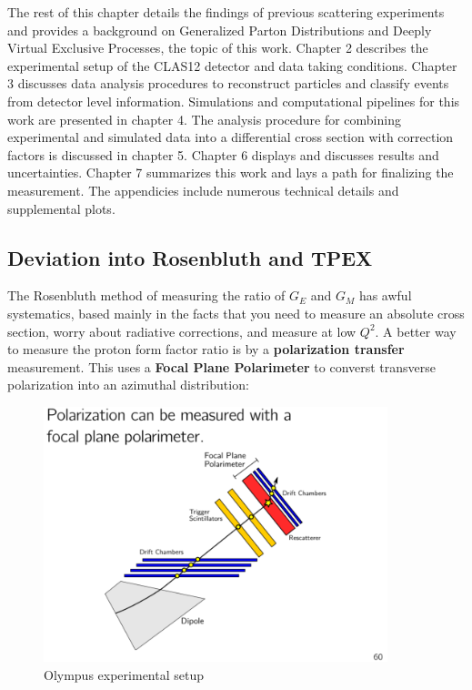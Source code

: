 The rest of this chapter details the findings of previous scattering experiments and provides a background on Generalized Parton Distributions and Deeply Virtual Exclusive Processes, the topic of this work. Chapter 2 describes the experimental setup of the CLAS12 detector and data taking conditions. Chapter 3 discusses data analysis procedures to reconstruct particles and classify events from detector level information. Simulations and computational pipelines for this work are presented in chapter 4. The analysis procedure for combining experimental and simulated data into a differential cross section with correction factors is discussed in chapter 5. Chapter 6 displays and discusses results and uncertainties. Chapter 7 summarizes this work and lays a path for finalizing the measurement. The appendicies include numerous technical details and supplemental plots. 





         
        \subsection{Deviation into Rosenbluth and TPEX}
        
                
            The Rosenbluth method of measuring the ratio of $G_E$ and $G_M$ has awful systematics, based mainly in the facts that you need to measure an absolute cross section, worry about radiative corrections, and measure at low $Q^2$. A better way to measure the proton form factor ratio is by a \textbf{polarization transfer} measurement. This uses a \textbf{Focal Plane Polarimeter} to converst transverse polarization into an azimuthal distribution:
            
                  
            \begin{figure}[H]
                \centering
                \includegraphics[width=10cm]{Chapters/Ch1-Intro/Ch1-Sec1-Background/pics/elastic-ep/olympus-fpp.PNG}
                \caption{Olympus experimental setup}
            \end{figure}
            

